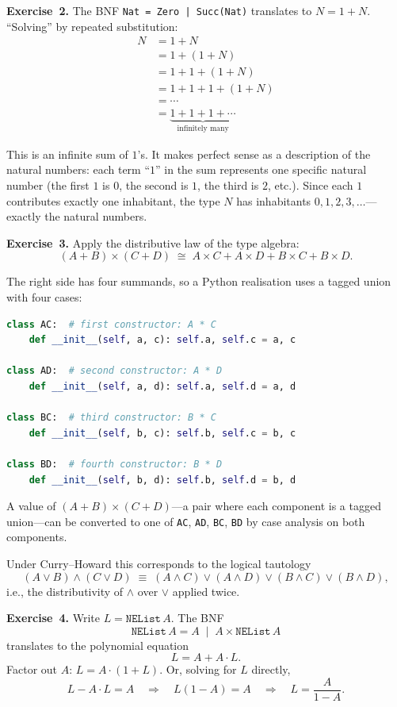 \documentclass[11pt]{article}
\begin{document}
\medskip
\textbf{Exercise~2.}
The BNF \texttt{Nat = Zero | Succ(Nat)} translates to $N = 1 + N$.
``Solving'' by repeated substitution:
\begin{align*}
  N &= 1 + N \\
    &= 1 + (1 + N) \\
    &= 1 + 1 + (1 + N) \\
    &= 1 + 1 + 1 + (1 + N) \\
    &= \cdots \\
    &= \underbrace{1 + 1 + 1 + \cdots}_{\text{infinitely many}}
\end{align*}

This is an infinite sum of $1$'s.  It makes perfect sense as a
description of the natural numbers: each term ``$1$'' in the sum
represents one specific natural number (the first $1$ is $0$, the
second is $1$, the third is $2$, etc.).  Since each $1$ contributes
exactly one inhabitant, the type $N$ has inhabitants
$0, 1, 2, 3, \ldots$---exactly the natural numbers.

\medskip
\textbf{Exercise~3.}
Apply the distributive law of the type algebra:
\[
  (A + B) \times (C + D)
    \;\cong\; A \times C + A \times D + B \times C + B \times D.
\]

The right side has four summands, so a Python realisation uses a
tagged union with four cases:
\begin{lstlisting}[language=Python]
class AC:  # first constructor: A * C
    def __init__(self, a, c): self.a, self.c = a, c

class AD:  # second constructor: A * D
    def __init__(self, a, d): self.a, self.d = a, d

class BC:  # third constructor: B * C
    def __init__(self, b, c): self.b, self.c = b, c

class BD:  # fourth constructor: B * D
    def __init__(self, b, d): self.b, self.d = b, d
\end{lstlisting}

A value of $(A + B) \times (C + D)$---a pair where each component is a
tagged union---can be converted to one of \texttt{AC}, \texttt{AD},
\texttt{BC}, \texttt{BD} by case analysis on both components.

Under Curry--Howard this corresponds to the logical tautology
\[
  (A \vee B) \wedge (C \vee D)
    \;\equiv\; (A \wedge C) \vee (A \wedge D)
             \vee (B \wedge C) \vee (B \wedge D),
\]
i.e., the distributivity of $\wedge$ over $\vee$ applied twice.

\medskip
\textbf{Exercise~4.}
Write $L = \texttt{NEList}\,A$.  The BNF
\[
  \texttt{NEList}\,A = A \;\mid\; A \times \texttt{NEList}\,A
\]
translates to the polynomial equation
\[
  L = A + A \cdot L.
\]
Factor out $A$: $L = A \cdot (1 + L)$.  Or, solving for $L$ directly,
\[
  L - A \cdot L = A
    \quad\Longrightarrow\quad
    L(1 - A) = A
    \quad\Longrightarrow\quad
    L = \frac{A}{1 - A}.
\]
\end{document}

